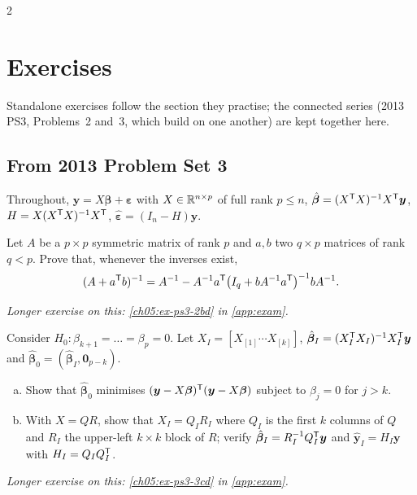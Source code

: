\begin{paracol}{2}
\section*{Exercises}
Standalone exercises follow the section they practise; the connected series (2013 PS3, Problems~2 and~3, which build on one another) are kept together here.

\subsection*{From 2013 Problem Set 3}
Throughout, $\bm y=X\bm\beta+\bm\varepsilon$ with $X\in\mathbb{R}^{n\times p}$ of full rank $p\le n$, $\hat{\bm\beta}=(X^{\mathsf T} X)^{-1}X^{\mathsf T}\bm y$, $H=X(X^{\mathsf T} X)^{-1}X^{\mathsf T}$,
$\hat{\bm\varepsilon}=(I_n-H)\bm y$.

\begin{exercise}\label{ch05:ex-ps3-2a}
Let $A$ be a $p\times p$ symmetric matrix of rank $p$ and $a,b$ two $q\times p$ matrices of rank $q<p$. Prove that, whenever the
inverses exist,
\[
  (A+a^{\mathsf T} b)^{-1}=A^{-1}-A^{-1}a^{\mathsf T}\bigl(I_q+bA^{-1}a^{\mathsf T}\bigr)^{-1}bA^{-1}.
\]
\end{exercise}

\noindent\emph{Longer exercise on this: \cref{ch05:ex-ps3-2bd} in \cref{app:exam}.}

\begin{exercise}\label{ch05:ex-ps3-3ab}
Consider $H_0:\beta_{k+1}=\dots=\beta_p=0$. Let $X_I=[X_{[1]}\cdots X_{[k]}]$, $\hat{\bm\beta}_I=(X_I^{\mathsf T} X_I)^{-1}X_I^{\mathsf T}\bm y$ and
$\hat{\bm\beta}_0=(\hat{\bm\beta}_I,\bm 0_{p-k})$.
\begin{enumerate}[(a)]
  \item Show that $\hat{\bm\beta}_0$ minimises $(\bm y-X\bm\beta)^{\mathsf T}(\bm y-X\bm\beta)$ subject to $\beta_j=0$ for $j>k$.
  \item With $X=QR$, show that $X_I=Q_IR_I$ where $Q_I$ is the first $k$ columns of $Q$ and $R_I$ the upper-left $k\times k$ block of $R$;
      verify $\hat{\bm\beta}_I=R_I^{-1}Q_I^{\mathsf T}\bm y$ and $\hat{\bm y}_I=H_I\bm y$ with $H_I=Q_IQ_I^{\mathsf T}$.
\end{enumerate}
\end{exercise}

\noindent\emph{Longer exercise on this: \cref{ch05:ex-ps3-3cd} in \cref{app:exam}.}


\end{paracol}
